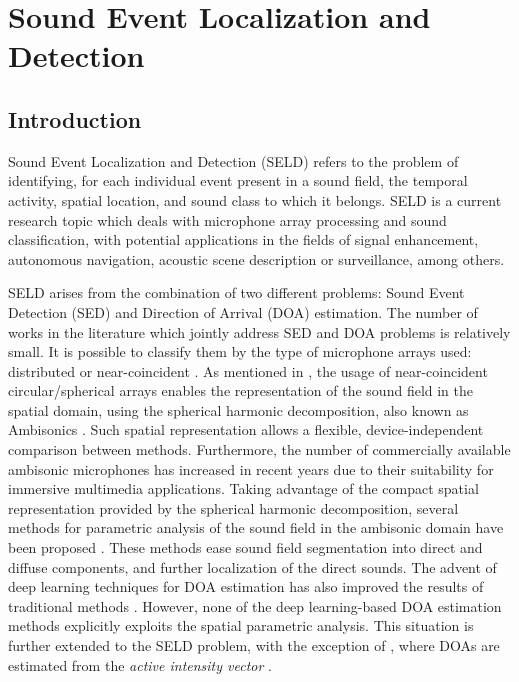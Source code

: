 \chapter{Sound Event Localization and Detection}
\label{chap:seld2019}

\section{Introduction}
\label{sec:intro}

Sound Event Localization and Detection (SELD) refers to the problem of identifying, for each individual  event present in a sound field, the temporal activity, spatial location, and sound class to which it belongs. SELD is a current research topic which deals with microphone array processing and sound classification, with potential applications in the fields of signal enhancement, autonomous navigation, acoustic scene description or surveillance, among others.

SELD arises from the combination of two different problems: Sound Event Detection (SED) and Direction of Arrival (DOA) estimation. The number of works in the literature which jointly address SED and DOA problems is relatively small. It is possible to classify them by the type of microphone arrays used: distributed \cite{grobler2017sound, butko2011two, chakraborty2014sound} or near-coincident \cite{hirvonen2015classification, lopatka2016detection, Adavanne2018_JSTSP}.
As mentioned in \cite{Adavanne2018_JSTSP}, the usage of near-coincident circular/spherical arrays enables the representation of the sound field in the spatial domain, using the spherical harmonic decomposition, also known as Ambisonics \cite{gerzon1973periphony, daniel2000representation}. Such spatial representation allows a flexible, device-independent comparison between methods. Furthermore, the number of commercially available ambisonic microphones has increased in recent years due to their suitability for immersive multimedia applications.  
Taking advantage of the compact spatial representation provided by the spherical harmonic decomposition, several methods for parametric analysis of the sound field in the ambisonic domain have been proposed  \cite{pulkki2006directional, berge2010high, Politis2018, pulkki2018parametric}.
These methods ease sound field segmentation into direct and diffuse components, and further localization of the direct sounds.
The advent of deep learning techniques for DOA estimation has also improved the results of traditional methods \cite{Adavanne2018_JSTSP}. However, none of the deep learning-based DOA estimation methods explicitly exploits the spatial parametric analysis. This situation is further extended to the SELD problem, with the exception of \cite{lopatka2016detection}, where DOAs are estimated from the \textit{active intensity vector}  \cite{pulkki2006directional}.


